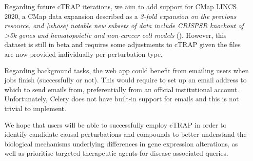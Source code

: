 Regarding future cTRAP iterations, we aim to add support for CMap LINCS 2020, a CMap data expansion described as a \emph{3-fold expansion on the previous resource, and [whose] notable new subsets of data include CRISPSR knockout of \textgreater 5k genes and hematopoietic and non-cancer cell models} (). However, this dataset is still in beta and requires some adjustments to cTRAP given the files are now provided individually per perturbation type.

Regarding background tasks, the web app could benefit from emailing users when jobs finish (successfully or not). This would require to set up an email address to which to send emails from, preferentially from an official institutional account. Unfortunately, Celery does not have built-in support for emails and this is not trivial to implement.

We hope that users will be able to successfully employ cTRAP in order to identify candidate causal perturbations and compounds to better understand the biological mechanisms underlying differences in gene expression alterations, as well as prioritise targeted therapeutic agents for disease-associated queries.

